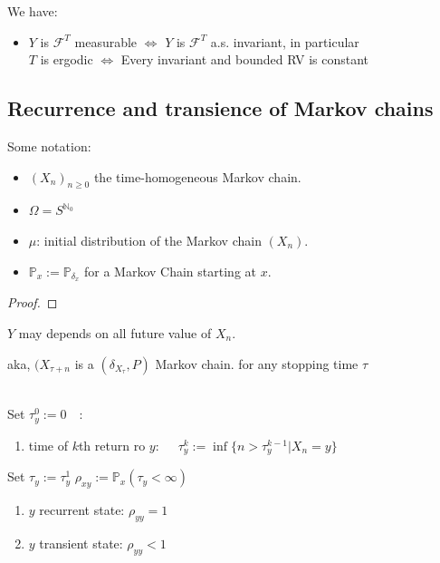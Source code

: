  


\begin{lemma} We have:
	\begin{itemize}
		\item $Y$ is $\mathcal{F}^T$ measurable $\Leftrightarrow$ $Y$ is $\mathcal{F}^T$ a.s. invariant, in particular\\
		$T$ is ergodic $\Leftrightarrow$ Every invariant and bounded RV is constant
	\end{itemize}
\end{lemma}



\subsection{Recurrence and transience of Markov chains}
 Some notation:
 \begin{itemize}
 	\item $(X_n)_{n \geq 0}$ the time-homogeneous Markov chain. 
 	\item $\Omega = S^{\mathbb{N}_0}$
 	\item $\mu$: initial distribution of the Markov chain $(X_n)$.
 	\item $\mathbb{P}_x := \mathbb{P}_{\delta_x}$ for a Markov Chain starting at $x$.
 \end{itemize}

 \begin{proof}
 \end{proof}
 \begin{remark}	
 $Y$ may depends on all future value of $X_n$.
 \end{remark}
 
 aka, $(X_{\tau + n}$ is a $(\delta_{X_\tau}, P)$ Markov chain. for any stopping time $\tau$ 

 
 \begin{definition}\quad \\
 	Set $\tau_y^0 := 0 \quad$:
 	\begin{enumerate}
 		\item time of $k$th return ro $y: \quad$ $\tau_y^k := \inf \{n > \tau_y^{k-1}| X_n = y\}$
 	\end{enumerate}
Set $\tau_y := \tau_y^1$ $\rho_{xy}:= \mathbb{P}_x(\tau_y < \infty)$
 	\begin{enumerate}
 		\item $y$ recurrent state: $\rho_{yy} = 1$
 		\item $y$ transient state: $\rho_{yy} < 1$
 	\end{enumerate}
 \end{definition}
 
